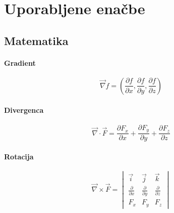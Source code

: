 \documentclass[a4paper,12pt]{article}
\begin{document}
\newpage
\section{Uporabljene enačbe}
\subsection{Matematika}
\begin{multicols}{2}

    \paragraph{Gradient}
    \begin{equation}
        \label{eq:gradient}
        \vec{\nabla} f = \left( \frac{\partial f}{\partial x}, \frac{\partial f}{\partial y}, \frac{\partial f}{\partial z} \right)
    \end{equation}

    \paragraph{Divergenca}
    \begin{equation}
        \label{eq:divergenca}
        \vec{\nabla} \cdot \vec{F} = \frac{\partial F_x}{\partial x} + \frac{\partial F_y}{\partial y} + \frac{\partial F_z}{\partial z}
    \end{equation}

    \paragraph{Rotacija}
    \begin{equation}
        \label{eq:rotacija}
        \vec{\nabla} \times \vec{F} = \begin{vmatrix}
            \vec{i}                     & \vec{j}                     & \vec{k}                     \\
            \frac{\partial}{\partial x} & \frac{\partial}{\partial y} & \frac{\partial}{\partial z} \\
            F_x                         & F_y                         & F_z
        \end{vmatrix}
    \end{equation}

\end{multicols}
\end{document}

